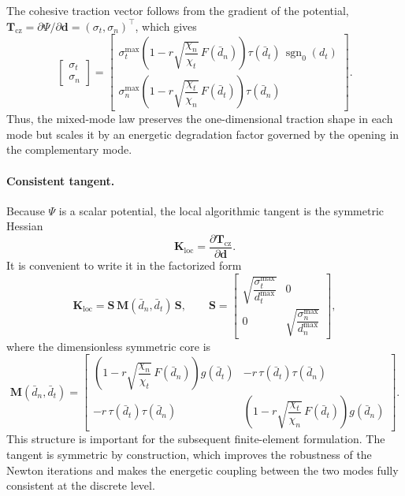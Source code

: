 \documentclass[smallextended]{svjour3}       %
\begin{document}
The cohesive traction vector follows from the gradient of the potential,
\(\mathbf{T}_{\mathrm{cz}}=\partial\Psi/\partial\mathbf{d}
=(\sigma_t,\sigma_n)^{\top}\), which gives
\begin{equation}
	\begin{bmatrix}
		\sigma_t\\[3pt]
		\sigma_n
	\end{bmatrix}
	=
	\begin{bmatrix}
		\sigma_t^{\max}
		\left(
		1-r\sqrt{\dfrac{\chi_n}{\chi_t}}\,F(\bar d_n)
		\right)
		\tau(\bar d_t)\,\operatorname{sgn}_0(d_t)
		\\[12pt]
		\sigma_n^{\max}
		\left(
		1-r\sqrt{\dfrac{\chi_t}{\chi_n}}\,F(\bar d_t)
		\right)
		\tau(\bar d_n)
	\end{bmatrix}.
	\label{eq:Tcz_mixed}
\end{equation}
Thus, the mixed-mode law preserves the one-dimensional traction shape in each
mode but scales it by an energetic degradation factor governed by the opening
in the complementary mode.

\paragraph{Consistent tangent.}
Because \(\Psi\) is a scalar potential, the local algorithmic tangent is the
symmetric Hessian
\[
\mathbf{K}_{\mathrm{loc}}
=
\frac{\partial \mathbf{T}_{\mathrm{cz}}}{\partial \mathbf{d}}.
\]
It is convenient to write it in the factorized form
\begin{equation}
	\mathbf{K}_{\mathrm{loc}}
	=
	\mathbf{S}\,\mathbf{M}(\bar d_n,\bar d_t)\,\mathbf{S},
	\qquad
	\mathbf{S}
	=
	\begin{bmatrix}
		\sqrt{\dfrac{\sigma_t^{\max}}{d_t^{\max}}} & 0 \\[8pt]
		0 & \sqrt{\dfrac{\sigma_n^{\max}}{d_n^{\max}}}
	\end{bmatrix},
	\label{eq:Kloc_factor}
\end{equation}
where the dimensionless symmetric core is
\begin{equation}
	\mathbf{M}(\bar d_n,\bar d_t)=
	\begin{bmatrix}
		\left(
		1-r\sqrt{\dfrac{\chi_n}{\chi_t}}\,F(\bar d_n)
		\right)g(\bar d_t)
		&
		-r\,\tau(\bar d_t)\tau(\bar d_n)
		\\[10pt]
		-r\,\tau(\bar d_t)\tau(\bar d_n)
		&
		\left(
		1-r\sqrt{\dfrac{\chi_t}{\chi_n}}\,F(\bar d_t)
		\right)g(\bar d_n)
	\end{bmatrix}.
	\label{eq:Mcore}
\end{equation}
This structure is important for the subsequent finite-element formulation.
The tangent is symmetric by construction, which improves the robustness of the
Newton iterations and makes the energetic coupling between the two modes fully
consistent at the discrete level.
\end{document}
